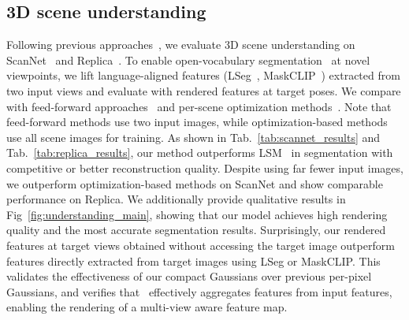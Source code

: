 \subsection{3D scene understanding}
Following previous approaches~\cite{fan2024large, burgess2006spatial}, we evaluate 3D scene understanding on ScanNet~\cite{dai2017scannet} and Replica~\cite{straub2019replica}. To enable open-vocabulary segmentation~\cite{cho2024cat,shin2024towards} at novel viewpoints, we lift language-aligned features (LSeg~\cite{li2022language}, MaskCLIP~\cite{zhou2022extract}) extracted from two input views and evaluate with rendered features at target poses. We compare with feed-forward approaches~\cite{fan2024large} and per-scene optimization methods~\cite{zhou2024feature, lee2025cf3}. Note that feed-forward methods use two input images, while optimization-based methods use all scene images for training. As shown in Tab.~\ref{tab:scannet_results} and Tab.~\ref{tab:replica_results}, our method outperforms LSM~\cite{fan2024large} in segmentation with competitive or better reconstruction quality. Despite using far fewer input images, we outperform optimization-based methods on ScanNet and show comparable performance on Replica. We additionally provide qualitative results in Fig~\ref{fig:understanding_main}, showing that our model achieves high rendering quality and the most accurate segmentation results. Surprisingly, our rendered features at target views obtained without accessing the target image outperform features directly extracted from target images using LSeg or MaskCLIP. This validates the effectiveness of our compact Gaussians over previous per-pixel Gaussians, and verifies that \oursF\ effectively aggregates features from input features, enabling the rendering of a multi-view aware feature map.

